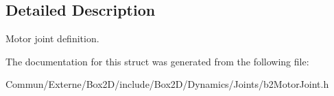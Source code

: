 \subsection{Detailed Description}
Motor joint definition. 

The documentation for this struct was generated from the following file\+:\begin{DoxyCompactItemize}
\item 
Commun/\+Externe/\+Box2\+D/include/\+Box2\+D/\+Dynamics/\+Joints/b2\+Motor\+Joint.\+h\end{DoxyCompactItemize}
